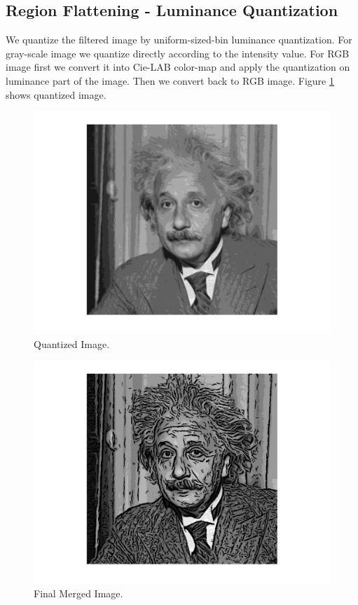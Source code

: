 \documentclass[a4paper]{article}
\begin{document}
\subsection{Region Flattening - Luminance Quantization}
We quantize the filtered image by uniform-sized-bin luminance quantization. 
For gray-scale image we quantize directly according to the intensity value. For RGB image first we convert it into Cie-LAB color-map and apply the quantization on luminance part of the image. Then we convert back to RGB image. Figure \ref{fig:quant} shows quantized image.
\begin{figure}
\centering
\includegraphics[width=1\textwidth]{quant.png}
\caption{\label{fig:quant}Quantized Image.}
\end{figure}

\begin{figure}
\centering
\includegraphics[width=1\textwidth]{final.png}
\caption{\label{fig:final}Final Merged Image.}
\end{figure}
\end{document}
